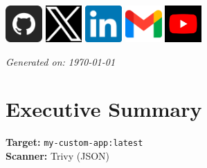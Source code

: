 \documentclass[10pt]{article}
\begin{document}
\begin{titlepage}
\begin{center}
  \begin{center}
    \href{https://github.com/ADITYADAS1999}{\includegraphics[width=1.4cm]{assets/3291667.png}} \hspace{0.5cm}
    \href{https://twitter.com/ADITYA90546170}{\includegraphics[width=1.4cm]{assets/images.png}} \hspace{0.5cm}
    \href{https://www.linkedin.com/in/aditya-das-7b2276202}{\includegraphics[width=1.4cm]{assets/linkin.png}} \hspace{0.5cm}
    \href{mailto:adityamca123@gmail.com}{\includegraphics[width=1.4cm]{assets/mail.png}} \hspace{0.5cm}
    \href{https://www.youtube.com/}{\includegraphics[width=1.4cm]{assets/yiutube.jpg}}
  \end{center}

  \vspace{1cm}
  \small \textit{Generated on: \today}
\end{center}

\thispagestyle{empty}
\end{titlepage}
\restoregeometry
\pagecolor{white}
\color{black}
\clearpage

\pagestyle{plain}
\tableofcontents
\clearpage
{}
\pagestyle{fancy}

\section*{Executive Summary}
\label{sec:summary}
\noindent
\textbf{Target:} \texttt{my-custom-app:latest} \\
\textbf{Scanner:} Trivy (JSON) \\
\end{document}
